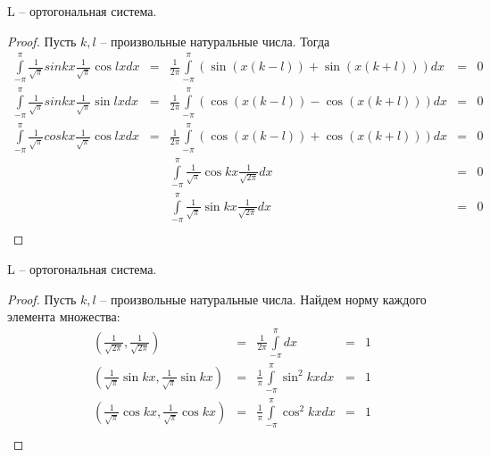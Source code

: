 \begin{statement}
    L -- ортогональная система.
    \begin{proof}
        Пусть $k, l$ -- произвольные натуральные числа. Тогда
        \[
            \begin{matrix}
                \int \limits_{-\pi}^{\pi} \frac{1}{\sqrt{\pi}} sin kx \frac{1}{\sqrt{\pi}} \cos lx dx
                & = &
                \frac{1}{2\pi} \int \limits_{-\pi}^{\pi} (\sin(x(k - l)) + \sin(x(k + l))) dx
                & = &
                0 \\
                \int \limits_{-\pi}^{\pi} \frac{1}{\sqrt{\pi}} sin kx \frac{1}{\sqrt{\pi}} \sin lx dx
                & = &
                \frac{1}{2\pi} \int \limits_{-\pi}^{\pi} (\cos(x(k - l)) - \cos(x(k + l))) dx
                & = &
                0 \\
                \int \limits_{-\pi}^{\pi} \frac{1}{\sqrt{\pi}} cos kx \frac{1}{\sqrt{\pi}} \cos lx dx
                & = &
                \frac{1}{2\pi} \int \limits_{-\pi}^{\pi} (\cos(x(k - l)) + \cos(x(k + l))) dx
                & = &
                0 \\  
                & & \int \limits_{-\pi}^{\pi} \frac{1}{\sqrt{\pi}} \cos kx \frac{1}{\sqrt{2\pi}} dx
                & = & 0 \\
                & & \int \limits_{-\pi}^{\pi} \frac{1}{\sqrt{\pi}} \sin kx \frac{1}{\sqrt{2\pi}} dx
                & = & 0 \\
            \end{matrix}
        \]
    \end{proof}
\end{statement}
\begin{statement}
    L -- ортогональная система.
    \begin{proof}
        Пусть $k, l$ -- произвольные натуральные числа. Найдем норму каждого элемента множества:
        \[
            \begin{matrix}
                (\frac{1}{\sqrt{2\pi}}, \frac{1}{\sqrt{2\pi}})
                & = &
                \frac{1}{2\pi} \int \limits_{-\pi}^{\pi} dx
                & = &
                1 \\

                (\frac{1}{\sqrt{\pi}} \sin kx, \frac{1}{\sqrt{\pi}} \sin kx)
                & = &
                \frac{1}{\pi} \int \limits_{-\pi}^{\pi} \sin^2 kx dx
                & = &
                1 \\

                (\frac{1}{\sqrt{\pi}} \cos kx, \frac{1}{\sqrt{\pi}} \cos kx)
                & = &
                \frac{1}{\pi} \int \limits_{-\pi}^{\pi} \cos^2 kx dx
                & = &
                1 \\
            \end{matrix}
        \]
    \end{proof}
\end{statement}